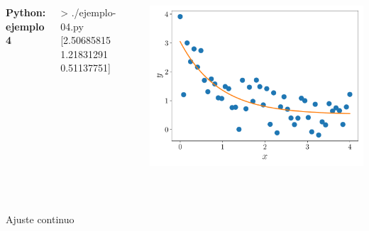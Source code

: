 \documentclass[9pt, aspectratio=169]{beamer}
\begin{document}
\begin{frame}[fragile]
\begin{columns}

\textbf{Python: ejemplo 4}

\begin{shell}
> ./ejemplo-04.py 
[2.50685815 1.21831291 0.51137751]
\end{shell}

\cx
\begin{center}
\includegraphics[scale=0.40]{code/ejem-04.pdf}
\end{center}
\end{columns}
\end{frame}

\begin{frame}[standout]\
    \begin{center}
        {\Huge Ajuste continuo}
    \end{center}
\end{frame}
\end{document}
